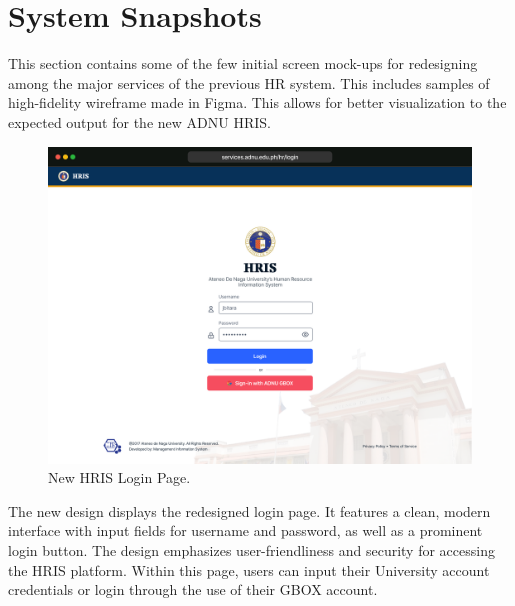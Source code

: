 \section{System Snapshots}

This section contains some of the few initial screen mock-ups for redesigning among the major services of the previous HR system. This includes samples of high-fidelity wireframe made in Figma. This allows for better visualization to the expected output for the new ADNU HRIS.

    \begin{figure}[H]
        \centering
        \includegraphics[width=1\linewidth]{figures/app/login.png}
        \caption{New HRIS Login Page.}
        \label{fig:app-login}
    \end{figure}

    The new design displays the redesigned login page. It features a clean, modern interface with input fields for username and password, as well as a prominent login button. The design emphasizes user-friendliness and security for accessing the HRIS platform. Within this page, users can input their University account credentials or login through the use of their GBOX account.

